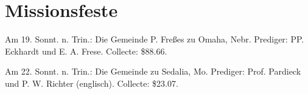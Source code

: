 \chapter{Missionsfeste}

Am 19. Sonnt. n. Trin.: Die Gemeinde P. Freßes zu Omaha, Nebr. Prediger: PP. Eckhardt und E. A. Frese. Collecte: \$88.66.

Am 22. Sonnt. n. Trin.: Die Gemeinde zu Sedalia, Mo. Prediger: Prof. Pardieck und P. W. Richter (englisch). Collecte: \$23.07.

